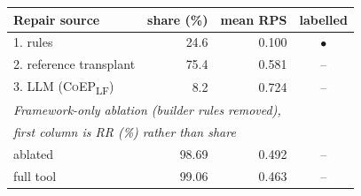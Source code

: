 \begin{tabular}{lrrc}
\toprule
Repair source & share (\%) & mean RPS & labelled \\
\midrule
1. rules & 24.6 & 0.100 & $\bullet$ \\
2. reference transplant & 75.4 & 0.581 & -- \\
\midrule
3. LLM (\textsc{CoEP}\textsubscript{LF}) & 8.2 & 0.724 & -- \\
\midrule
\multicolumn{4}{l}{\emph{Framework-only ablation (builder rules removed),}}\\
\multicolumn{4}{l}{\emph{first column is RR (\%) rather than share}}\\
\quad ablated & 98.69 & 0.492 & -- \\
\quad full tool & 99.06 & 0.463 & -- \\
\bottomrule
\end{tabular}
